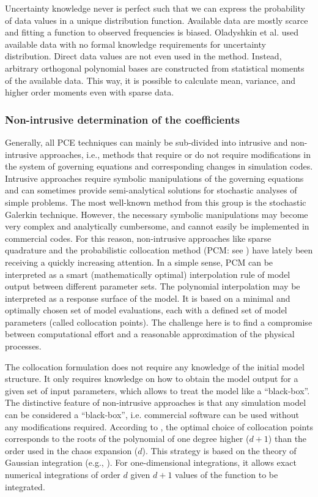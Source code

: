 Uncertainty knowledge never is perfect such that we can express the probability
of data values in a unique distribution function. Available data are mostly
scarce and fitting a function to observed frequencies is biased. Oladyshkin et
al. \cite{oladyshkin2011concept} used available data with no formal knowledge
requirements for uncertainty distribution. Direct data values are not even used
in the method. Instead, arbitrary orthogonal polynomial bases are constructed
from statistical moments of the available data. This way, it is possible to
calculate mean, variance, and higher order moments even with sparse data. 


\subsubsection{Non-intrusive determination of the coefficients}

Generally, all PCE techniques can mainly be sub-divided into
intrusive \cite{Ghanem1993,Matthies2005,Xiu2003} and non-intrusive
\cite{Keese2003,Isukapalli1998,nLi2007,oladyshkinintegrative}
approaches, i.e., methods that require or do not require modifications in the
system of governing equations and corresponding changes in
simulation codes. Intrusive approaches require symbolic manipulations of the
governing
equations and can sometimes provide semi-analytical solutions for stochastic
analyses of simple problems. The most well-known method from this group is the
stochastic Galerkin technique. However, the necessary symbolic manipulations may
become very complex and analytically cumbersome, and cannot easily be
implemented in commercial codes. For this reason, non-intrusive approaches like
sparse quadrature and the probabilistic collocation method (PCM: see
\cite{nLi2007,oladyshkinintegrative}) have lately been
receiving a quickly increasing attention. In a simple sense, PCM can be
interpreted
as a smart (mathematically optimal) interpolation rule of model output between
different parameter sets. The polynomial interpolation may be interpreted as a
response surface of the model. It is based on a minimal and optimally chosen set
of
model evaluations, each with a defined set of model parameters (called
collocation
points). The challenge here is to find a compromise between computational effort
and a
reasonable approximation of the physical processes.


The collocation formulation does not require any knowledge of the initial model
structure. It only requires knowledge on how to obtain the model output for a
given set of input parameters, which allows to treat the model  like a
\textquotedblleft black-box\textquotedblright.  The distinctive feature of
non-intrusive approaches is that any simulation model can be considered a
``black-box'', i.e. commercial software can be used without any modifications
required.  According to \cite{Villadsen1978}, the optimal choice of collocation
points corresponds to the roots of the polynomial of one degree higher ($d+1$)
than the order used in the chaos expansion ($d$). This strategy is based on the
theory of Gaussian integration (e.g., \cite{Abramowitz1965}). For
one-dimensional integrations, it allows exact numerical integrations of order
$d$ given $d+1$ values of the function to be integrated. 

